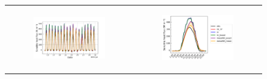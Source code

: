 \begin{figure}[hbtp]
\begin{tabular}{cc}
        \begin{subfigure}[t]{0.5\textwidth}
            \caption{}
            \includegraphics[width=\textwidth]{images/chap5/SOP_TS_DC/time_series_elsplans_sens.png}
        \end{subfigure} &
        \begin{subfigure}[t]{0.5\textwidth}
            \caption{}
            \includegraphics[width=\textwidth]{images/chap5/SOP_TS_DC/diurnal_cycle_elsplans_sens.png}
        \end{subfigure} \\


\end{tabular}
\end{figure}
